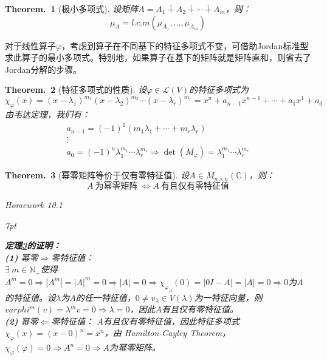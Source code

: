 \documentclass[zihao=5,UTF8]{report}
\theoremstyle{mystyle} %
\newtheorem{theorem}{Theorem.\,}
\newenvironment{graybox}{%
\def\FrameCommand{%
\hspace{1pt}%
{\color{gray}\small \vrule width 2pt}%
{\color{graybox_color}\vrule width 4pt}%
\colorbox{graybox_color}%
}%
\MakeFramed{\advance\hsize-\width\FrameRestore}%
\noindent\hspace{-4.55pt}%
\begin{adjustwidth}{}{7pt}%
\vspace{2pt}\vspace{2pt}%
}
{%
\vspace{2pt}\end{adjustwidth}\endMakeFramed%
}
\begin{document}
\begin{theorem}[极小多项式]\label{极小多项式}
设矩阵$A = A_1 \dotplus A_2 \dotplus \cdots \dotplus A_m$，则：
\begin{equation*}
    \mu_A = l.c.m(\mu_{A_1},...,\mu_{A_m})
\end{equation*}
\end{theorem}
{\par\color{gray}\small
对于线性算子$\varphi$，考虑到算子在不同基下的特征多项式不变，可借助Jordan标准型求此算子的最小多项式。特别地，如果算子在基下的矩阵就是矩阵直和，则省去了Jordan分解的步骤。
\par}
\begin{theorem}[特征多项式的性质]\label{特征多项式的性质}
设$\varphi \in \mathscr{L}(V)$的特征多项式为
\begin{equation*}
    \chi_{\varphi}(x) = (x-\lambda_1)^{m_1}(x-\lambda_2)^{m_2} \cdots (x-\lambda_r)^{m_r} = x^n + a_{n-1}x^{n-1} + \cdots + a_1x^1 + a_0    
\end{equation*}
由韦达定理，我们有：
\begin{gather*}
    a_{n-1} = (-1)^1\left(m_1\lambda_1 + \cdots + m_r\lambda_r \right)\\
    \vdots \\
    a_0 = (-1)^n \lambda_1^{m_1}\cdots\lambda_r^{m_r}\Longrightarrow \det(M_{\varphi}) =  \lambda_1^{m_1}\cdots\lambda_r^{m_r}
\end{gather*}
\end{theorem}

\begin{theorem}[幂零矩阵等价于仅有零特征值]\label{幂零矩阵仅有零特征值}
设$A \in M_{n\times n}(\mathbb{C})$，则：
\begin{equation*}
    A\ \text{为幂零矩阵}\ \Longleftrightarrow A\ \text{有且仅有零特征值}
\end{equation*}
{\par\color{gray}\small
Homework 10.1 
\par}

\begin{graybox}
\textbf{定理\ref{幂零矩阵仅有零特征值}的证明：}\\
\textbf{(1) }幂零$\Longrightarrow$零特征值：\\
$\exists\ m \in \mathbb{N}_+$使得$A^m = 0 \Longrightarrow |A^m| = |A|^m = 0 \Longrightarrow |A| = 0 \Longrightarrow \chi_{\varphi_A}(0) = |0I - A| = |A| = 0 \Longrightarrow 0$为$A$的特征值。设$\lambda$为$A$的任一特征值，$0 \ne v_{\lambda} \in V(\lambda)$为一特征向量，则$varphi^m(v) = \lambda^m v = 0 \Longrightarrow \lambda = 0$，因此$A$有且仅有零特征值。\\
\textbf{(2) }幂零$\Longleftarrow$零特征值：
$A$有且仅有零特征值，因此特征多项式$\chi_{\varphi}(x) = (x-0)^n = x^n$，由 Hamilton-Cayley Theorem，$\chi_{\varphi}(\varphi) = 0 \Longrightarrow A^n = 0 \Longrightarrow A$为幂零矩阵。
\end{graybox}
\end{theorem}
\end{document}
